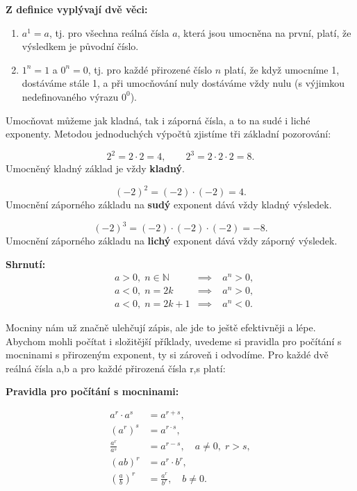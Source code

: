\documentclass[12pt,a4paper]{article}
\begin{document}
\textbf{Z definice vyplývají dvě věci:}
\begin{enumerate}[label=\arabic*)]
    \item \(a^1 = a\), tj. pro všechna reálná čísla \(a\), která jsou umocněna na první, platí, že výsledkem je původní číslo.
    \item \(1^n = 1\) a \(0^n = 0\), tj. pro každé přirozené číslo \(n\) platí, že když umocníme 1, dostáváme stále 1, a při umocňování nuly dostáváme vždy nulu (s výjimkou nedefinovaného výrazu \(0^0\)).
\end{enumerate}


Umocňovat můžeme jak kladná, tak i záporná čísla, a to na sudé i liché exponenty. 
Metodou jednoduchých výpočtů zjistíme tři základní pozorování:

\begin{examplebox}
\[
2^2 = 2 \cdot 2 = 4, \qquad 
2^3 = 2 \cdot 2 \cdot 2 = 8.
\]
Umocněný kladný základ je vždy \textbf{kladný}.
\end{examplebox}

\begin{examplebox}
\[
(-2)^2 = (-2)\cdot(-2) = 4.
\]
Umocnění záporného základu na \textbf{sudý} exponent dává vždy kladný výsledek.
\end{examplebox}

\begin{examplebox}
\[
(-2)^3 = (-2)\cdot(-2)\cdot(-2) = -8.
\]
Umocnění záporného základu na \textbf{lichý} exponent dává vždy záporný výsledek.
\end{examplebox}

\textbf{Shrnutí:}
\[
\begin{aligned}
&a>0,\; n\in\mathbb{N} &\implies &\; a^n>0, \\[6pt]
&a<0,\; n=2k &\implies &\; a^n>0, \\[6pt]
&a<0,\; n=2k+1 &\implies &\; a^n<0.
\end{aligned}
\]

Mocniny nám už značně ulehčují zápis, ale jde to ještě efektivněji a lépe. Abychom mohli počítat i složitější příklady, uvedeme si pravidla pro počítání s mocninami s přirozeným exponent, ty si zároveň i odvodíme.
Pro každé dvě reálná čísla a,b a pro každé přirozená čísla r,s platí:


\textbf{Pravidla pro počítání s mocninami:}
\begin{definitionbox}
\[
\begin{aligned}
a^r \cdot a^s &= a^{r+s}, \\[6pt]
(a^r)^s &= a^{r\cdot s}, \\[6pt]
\frac{a^r}{a^s} &= a^{r-s}, \quad a \neq 0,\; r>s, \\[6pt]
(ab)^r &= a^r \cdot b^r, \\[6pt]
\left(\frac{a}{b}\right)^r &= \frac{a^r}{b^r}, \quad b \neq 0.
\end{aligned}
\]    
\end{definitionbox}
\end{document}
